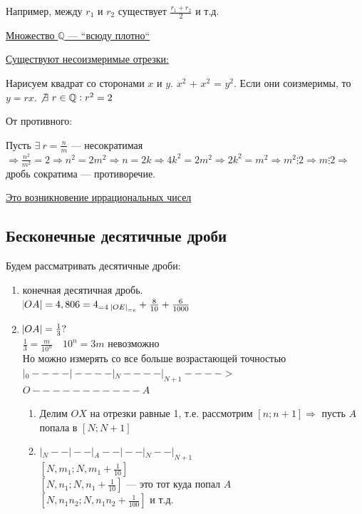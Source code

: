 \documentclass{article}
\begin{document}
            Например, между $r_1$ и $r_2$ существует $\frac{r_1 + r_2}{2}$ и т.д.

            \underline{Множество $\mathbb{Q}$ --- ``всюду плотно``} 

            \underline{Существуют несоизмеримые отрезки:}

            Нарисуем квадрат со сторонами $x$ и $y$.
            $x^2$ + $x^2$ = $y^2$.
            Если они соизмеримы, то $y = rx$.
            $\not\exists\ r \in \mathbb{Q}: r^2 = 2$

            От противного:

            Пусть $\exists\ r = \frac{n}{m}$ --- несократимая $\Rightarrow \frac{n^2}{m^2} = 2 \Rightarrow n^2 = 2m^2 \Rightarrow n = 2k \Rightarrow 4k^2 = 2m^2 \Rightarrow 2k^2 = m^2 \Rightarrow m^2 \vdots 2 \Rightarrow m \vdots 2 \Rightarrow$ дробь сократима --- противоречие.

            \underline{Это возникновение иррациональных чисел}

        \subsection{Бесконечные десятичные дроби}
            Будем рассматривать десятичные дроби:
            \begin{enumerate}
                \item конечная десятичная дробь.\\
                $\abs{OA} = 4,806 = 4_{= 4\ \abs{OE}_{= e}} + \frac{8}{10} + \frac{6}{1000}$\\
                \item $\abs{OA} = \frac{1}{3}?$\\
                $\frac{1}{3} = \frac{m}{10^n} \quad 10^n = 3m$ невозможно\\
                Но можно измерять со все больше возрастающей точностью\\
                $|_{0}----|----|_{N}----|_{N+1}---->$\\
                $O-----------A$\\
                \begin{enumerate}[1.]
                    \item Делим $OX$ на отрезки равные 1, т.е. рассмотрим $[n; n+1] \Rightarrow$ пусть $A$ попала в $[N; N+1]$
                    \item $|_{N}--|--|_{A}--|--|_{N}--|_{N+1}$\\
                    $[N,m_1;N,m_1 + \frac{1}{10}]$\\
                    $[N,n_1;N,n_1 + \frac{1}{10}]$ --- это тот куда попал $A$\\
                    $[N,n_1n_2;N,n_1n_2 + \frac{1}{100}]$ и т.д.\\
                \end{enumerate}
            \end{enumerate}
\end{document}
